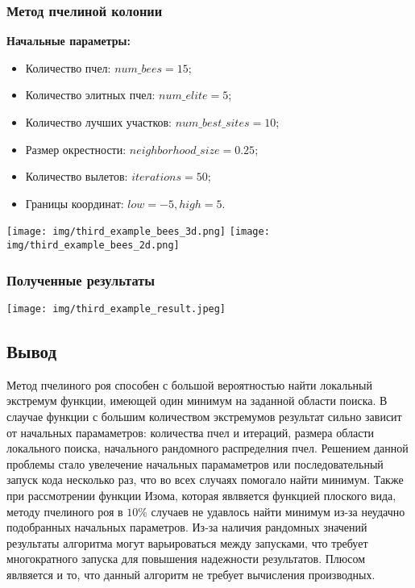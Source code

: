 \documentclass{article}
\begin{document}
\subsubsection*{Метод пчелиной колонии}
\textbf{Начальные параметры:}
\begin{itemize}
    \item Количество пчел: $num\_bees = 15$;
    \item Количество элитных пчел: $num\_elite = 5$;
    \item Количество лучших участков: $num\_best\_sites = 10$;
    \item Размер окрестности: $neighborhood\_size = 0.25$;
    \item Количество вылетов: $iterations = 50$;
    \item Границы координат: $low = -5, high = 5$.
\end{itemize}
\begin{center}
    \texttt{[image: img/third\_example\_bees\_3d.png]}
    \texttt{[image: img/third\_example\_bees\_2d.png]}
    \label{fig:enter-label}
\end{center}
\subsubsection*{Полученные результаты}
\texttt{[image: img/third\_example\_result.jpeg]}

\subsection*{Вывод}
Метод пчелиного роя способен с большой вероятностью найти локальный экстремум функции, имеющей один минимум на заданной области поиска. В слаучае функции с большим количеством экстремумов результат сильно зависит от начальных парамаметров: количества пчел и итераций, размера области локального поиска, начального рандомного распределния пчел. Решением данной проблемы стало увелечение начальных парамаметров или последовательный запуск кода несколько раз, что во всех случаях помогало найти минимум. Также при рассмотрении функции Изома, которая явлвяется функцией плоского вида, методу пчелиного роя в $10\%$ случаев не удавлось найти минимум из-за неудачно подобранных начальных параметров. Из-за наличия рандомных значений результаты алгоритма могут варьироваться между запусками, что требует многократного запуска для повышения надежности результатов. Плюсом явлвяется и то, что данный алгоритм не требует вычисления производных.
\end{document}
